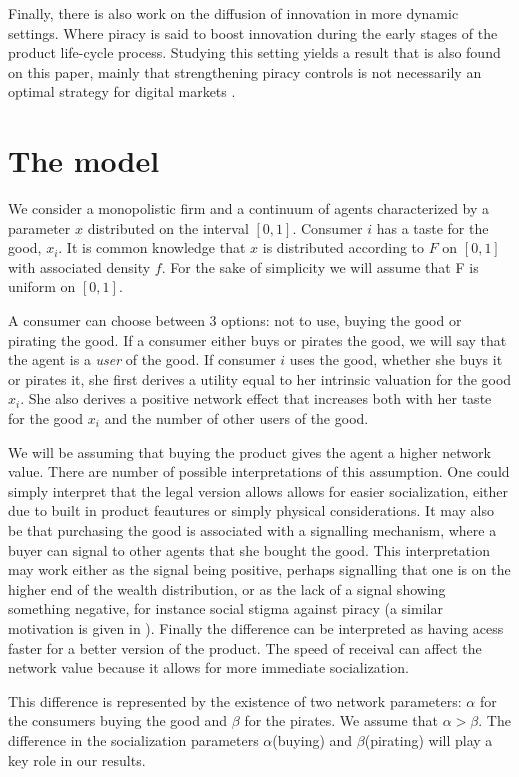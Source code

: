 \documentclass[12pt]{report}
\numberwithin{equation}{section}
\begin{document}
Finally, there is also work on the diffusion of innovation in more dynamic settings. Where piracy is said to boost innovation during the early stages of the product life-cycle process. Studying this setting yields a result that is also found on this paper, mainly that strengthening piracy controls is not necessarily an optimal strategy for digital markets\citep{G03}  \citep{GMM95}.


\section{The model}

We consider a monopolistic firm and a continuum of agents characterized by a parameter $x$ distributed on the interval $[0,1]$. Consumer $i$ has a taste for the good, $x_i$. It is common knowledge that $x$ is distributed according to $F$ on $[0,1]$ with associated density $f$. For the sake of simplicity we will assume that F is uniform on $[0,1]$. 

A consumer can choose between 3 options: not to use, buying the good or pirating the good. If a consumer either buys or pirates the good, we will say that the agent is a \textit{user} of the good. If consumer $i$ uses the good, whether she buys it or pirates it, she first derives a utility equal to her intrinsic valuation for the good $x_i$. She also derives a positive network effect that increases both with her taste for the good $x_i$ and the number of other users of the good. 

We will be assuming that buying the product gives the agent a higher network value. There are number of possible interpretations of this assumption. One could simply interpret that the legal version allows allows for easier socialization, either due to built in product feautures or simply physical considerations. It may also be that purchasing the good is associated with a signalling mechanism, where a buyer can signal to other agents that she bought the good. This interpretation may work either as the signal being positive, perhaps signalling that one is on the higher end of the wealth distribution, or as the lack of a signal showing something negative, for instance social stigma against piracy (a similar motivation is given in \cite{CRP91}). Finally the difference can be interpreted as having acess faster for a better version of the product. The speed of receival can affect the network value because it allows for more immediate socialization. 

This difference is represented by the existence of two network parameters: $\alpha$ for the consumers buying the good and $\beta$ for the pirates. We assume that $\alpha > \beta$. The difference in the socialization parameters $\alpha$(buying) and $\beta$(pirating) will play a key role in our results. 
\end{document}
